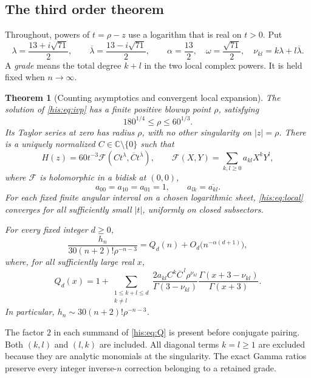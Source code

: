 \documentclass[11pt]{article}
\newtheorem{theorem}{Theorem}[section]
\theoremstyle{remark}\newtheorem{remark}[theorem]{Remark}
\newcommand{\C}{\mathbb C}
\newcommand{\la}{\lambda}
\newcommand{\lab}{{\overline{\lambda}}}
\numberwithin{equation}{section}
\begin{document}
\subsection{The third order theorem}
Throughout, powers of $t=\rho-z$ use a logarithm that is real on $t>0$. Put
\begin{equation}\label{his:eq:exponents}
 \la=\frac{13+i\sqrt{71}}2,\qquad
 \lab=\frac{13-i\sqrt{71}}2,\qquad
 \alpha=\frac{13}{2},\quad \omega=\frac{\sqrt{71}}2,\quad
 \nu_{kl}=k\la+l\lab.
\end{equation}
A \emph{grade} means the total degree $k+l$ in the two local complex powers. It is held fixed when $n\to\infty$.

\begin{theorem}[Counting asymptotics and convergent local expansion]\label{his:thm:main}
The solution of \eqref{his:eq:ivp} has a finite positive blowup point $\rho$, satisfying
\begin{equation}\label{his:eq:rho-bounds}
 180^{1/4}\le\rho\le60^{1/3}.
\end{equation}
Its Taylor series at zero has radius $\rho$, with no other singularity on $|z|=\rho$. There is a uniquely normalized $C\in\C\setminus\{0\}$ such that
\begin{equation}\label{his:eq:local}
 H(z)=60t^{-3}\mathcal F(Ct^\la,\overline C t^\lab),\qquad
 \mathcal F(X,Y)=\sum_{k,l\ge0}a_{kl}X^kY^l,
\end{equation}
where $\mathcal F$ is holomorphic in a bidisk at $(0,0)$,
\[
 a_{00}=a_{10}=a_{01}=1,\qquad a_{lk}=\overline{a_{kl}}.
\]
For each fixed finite angular interval on a chosen logarithmic sheet, \eqref{his:eq:local} converges for all sufficiently small $|t|$, uniformly on closed subsectors.

For every fixed integer $d\ge0$,
\begin{equation}\label{his:eq:count-theorem}
 \frac{h_n}{30(n+2)!\rho^{-n-3}}
 =Q_d(n)+O_d\bigl(n^{-\alpha(d+1)}\bigr),
\end{equation}
where, for all sufficiently large real $x$,
\begin{equation}\label{his:eq:Q}
 Q_d(x)=1+
 \sum_{\substack{1\le k+l\le d\\k\ne l}}
 \frac{2a_{kl}C^k\overline C^{\,l}\rho^{\nu_{kl}}}{\Gamma(3-\nu_{kl})}
 \frac{\Gamma(x+3-\nu_{kl})}{\Gamma(x+3)}.
\end{equation}
In particular, $h_n\sim30(n+2)!\rho^{-n-3}$.
\end{theorem}
The factor $2$ in each summand of \eqref{his:eq:Q} is present before conjugate pairing. Both $(k,l)$ and $(l,k)$ are included. All diagonal terms $k=l\ge1$ are excluded because they are analytic monomials at the singularity. The exact Gamma ratios preserve every integer inverse-$n$ correction belonging to a retained grade.
\end{document}
